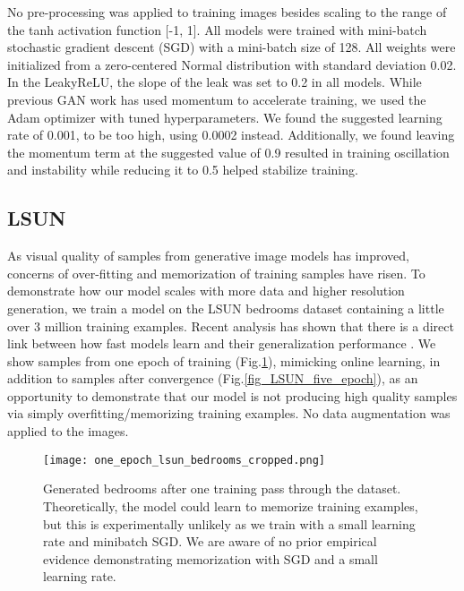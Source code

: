 \documentclass{article} \usepackage{iclr2016_conference,times}
\begin{document}
No pre-processing was applied to training images besides scaling to the range of the tanh activation function [-1, 1]. All models were trained with mini-batch stochastic gradient descent (SGD) with a mini-batch size of 128. All weights were initialized from a zero-centered Normal distribution with standard deviation 0.02. In the LeakyReLU, the slope of the leak was set to 0.2 in all models. While previous GAN work has used momentum to accelerate training, we used the Adam optimizer \citep{kingma2014adam} with tuned hyperparameters. We found the suggested learning rate of 0.001, to be too high, using 0.0002 instead. Additionally, we found leaving the momentum term  at the suggested value of 0.9 resulted in training oscillation and instability while reducing it to 0.5 helped stabilize training.

\subsection{LSUN}

As visual quality of samples from generative image models has improved, concerns of over-fitting and memorization of training samples have risen. 
To demonstrate how our model scales with more data and higher resolution generation, we train a model on the LSUN bedrooms dataset  containing a little over 3 million training examples. Recent analysis has shown that there is a direct link between how fast models learn and their generalization performance \citep{hardt2015train}. We show samples from one epoch of training (Fig.\ref{fig_LSUN_one_epoch}), mimicking online learning, in addition to samples after convergence (Fig.\ref{fig_LSUN_five_epoch}), as an opportunity to demonstrate that our model is not producing high quality samples via simply overfitting/memorizing training examples. No data augmentation was applied to the images.

\begin{figure}[h]
\begin{center}
\texttt{[image: one\_epoch\_lsun\_bedrooms\_cropped.png]}
\end{center}
\caption{\label{fig_LSUN_one_epoch} Generated bedrooms after one training pass through the dataset. Theoretically, the model could learn to memorize training examples, but this is experimentally unlikely as we train with a small learning rate and minibatch SGD. We are aware of no prior empirical evidence demonstrating memorization with SGD and a small learning rate.}
\end{figure}
\end{document}
